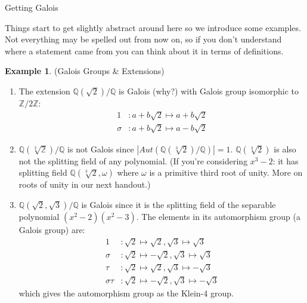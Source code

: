 \documentclass[12pt]{article}
\theoremstyle{definition}
\theoremstyle{definition}
\theoremstyle{definition}
\newtheorem{example}{Example}[section]
\theoremstyle{definition}
\theoremstyle{definition}
\theoremstyle{definition}
\theoremstyle{definition}
\begin{document}
\begin{section}{Getting Galois}
    
    Things start to get slightly abstract around here so we introduce some examples. Not everything may be spelled out from now on, so if you don't understand 
    where a statement came from you can think about it in terms of definitions.
    \begin{example}{(Galois Groups \& Extensions)}
        \begin{enumerate}
            \item The extension \(\mathbb{Q}(\sqrt{2})/\mathbb{Q}\) is Galois (why?) with Galois group isomorphic to \(\mathbb{Z}/2\mathbb{Z}\):
            \begin{align*}
                1 &: a+b\sqrt{2} \mapsto a+b\sqrt{2}\\
                \sigma &: a+b\sqrt{2} \mapsto a-b\sqrt{2}
            \end{align*}

            \item \(\mathbb{Q(\sqrt[3]{2})}/\mathbb{Q}\) is not Galois since \(\left|Aut(\mathbb{Q}(\sqrt[3]{2})/\mathbb{Q})\right| = 1\). \(\mathbb{Q}(\sqrt[3]{2})\)
            is also not the splitting field of any polynomial. (If you're considering \(x^3-2\): it has splitting field \(\mathbb{Q}(\sqrt[3]{2}, \omega)\) where \(\omega\)
            is a primitive third root of unity. More on roots of unity in our next handout.)

            \item \(\mathbb{Q}(\sqrt{2},\sqrt{3})/\mathbb{Q}\) is Galois since it is the splitting field of the separable polynomial \((x^2-2)(x^2-3)\). The elements in its 
            automorphism group (a Galois group) are:
            \begin{align*}
                1 &: \sqrt{2} \mapsto \sqrt{2}, \sqrt{3} \mapsto \sqrt{3}\\
                \sigma &: \sqrt{2} \mapsto -\sqrt{2}, \sqrt{3} \mapsto \sqrt{3}\\
                \tau &: \sqrt{2} \mapsto \sqrt{2}, \sqrt{3} \mapsto -\sqrt{3}\\
                \sigma\tau &: \sqrt{2} \mapsto -\sqrt{2}, \sqrt{3} \mapsto -\sqrt{3}
            \end{align*}
            which gives the automorphism group as the Klein-4 group.
        \end{enumerate}
    \end{example}
\end{section}

\newpage
\end{document}
